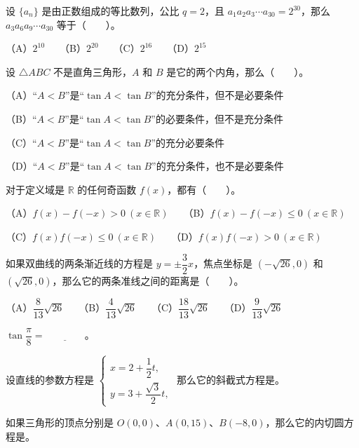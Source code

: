 \begin{question}
设 $\{a_n\}$ 是由正数组成的等比数列，公比 $q=2$，且 $a_1a_2a_3\cdots a_{30}=2^{30}$，那么 $a_3a_6a_9\cdots a_{30}$ 等于\mbox{（　　）}。

（A）$2^{10}$　　（B）$2^{20}$　　（C）$2^{16}$　　（D）$2^{15}$

\end{question}
\begin{question}
设 $\triangle ABC$ 不是直角三角形，$A$ 和 $B$ 是它的两个内角，那么\mbox{（　　）}。

（A）“$A<B$”是“$\tan A<\tan B$”的充分条件，但不是必要条件

（B）“$A<B$”是“$\tan A<\tan B$”的必要条件，但不是充分条件

（C）“$A<B$”是“$\tan A<\tan B$”的充分必要条件

（D）“$A<B$”是“$\tan A<\tan B$”的充分条件，也不是必要条件

\end{question}
\begin{question}
对于定义域是 $\mathbb R$ 的任何奇函数 $f(x)$，都有\mbox{（　　）}。

（A）$f(x)-f(-x)>0\ (x\in\mathbb R)$　　（B）$f(x)-f(-x)\le0\ (x\in\mathbb R)$

（C）$f(x)f(-x)\le0\ (x\in\mathbb R)$　　（D）$f(x)f(-x)>0\ (x\in\mathbb R)$

\end{question}
\begin{question}
如果双曲线的两条渐近线的方程是 $y=\pm\dfrac32x$，焦点坐标是 $(-\sqrt{26},0)$ 和 $(\sqrt{26},0)$，那么它的两条准线之间的距离是\mbox{（　　）}。

（A）$\dfrac8{13}\sqrt{26}$　　（B）$\dfrac4{13}\sqrt{26}$　　（C）$\dfrac{18}{13}\sqrt{26}$　　（D）$\dfrac9{13}\sqrt{26}$

\end{question}
\begin{question}
$\tan\dfrac\pi8=\underline{\qquad\qquad}$。

\end{question}
\begin{question}
设直线的参数方程是 $\begin{cases}x=2+\dfrac12t,\\y=3+\dfrac{\sqrt3}{2}t,\end{cases}$ 那么它的斜截式方程是\underline{\qquad\qquad}。

\end{question}
\begin{question}
如果三角形的顶点分别是 $O(0,0)$、$A(0,15)$、$B(-8,0)$，那么它的内切圆方程是\underline{\qquad\qquad}。

\end{question}
